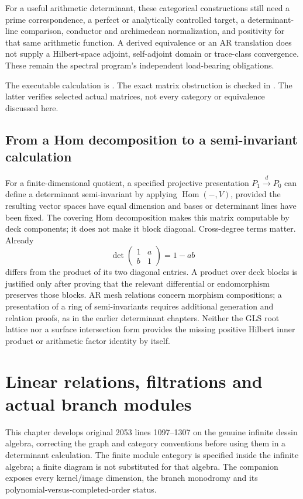 \documentclass[11pt,oneside,openany]{book}
\theoremstyle{definition}\newtheorem{definition}[theorem]{Definition}
\theoremstyle{remark}\newtheorem{remark}[theorem]{Remark}
\begin{document}
For a useful arithmetic determinant, these categorical constructions still
need a prime correspondence, a perfect or analytically controlled target,
a determinant-line comparison, conductor and archimedean normalization,
and positivity for that same arithmetic function. A derived equivalence
or an AR translation does not supply a Hilbert-space adjoint, self-adjoint
domain or trace-class convergence. These remain the spectral program's
independent load-bearing obligations.

The executable calculation is .
The exact matrix obstruction is checked in .
The latter verifies selected actual matrices, not every category or
equivalence discussed here.

\section{From a Hom decomposition to a semi-invariant calculation}
For a finite-dimensional quotient, a specified projective presentation
$P_1\xrightarrow{d}P_0$ can define a determinant semi-invariant by applying
$\operatorname{Hom}(-,V)$, provided the resulting vector spaces have equal
dimension and bases or determinant lines have been fixed. The covering Hom
decomposition makes this matrix computable by deck components; it does not
make it block diagonal. Cross-degree terms matter. Already
\[
 \det\begin{pmatrix}1&a\\b&1\end{pmatrix}=1-ab
\]
differs from the product of its two diagonal entries. A product over deck
blocks is justified only after proving that the relevant differential or
endomorphism preserves those blocks. AR mesh relations concern morphism
compositions; a presentation of a ring of semi-invariants requires additional
generation and relation proofs, as in the earlier determinant chapters.
Neither the GLS root lattice nor a surface intersection form provides the
missing positive Hilbert inner product or arithmetic factor identity by
itself.

\chapter{Linear relations, filtrations and actual branch modules}
\label{rel:chapter}
This chapter develops original 2053 lines 1097--1307 on the genuine infinite
dessin algebra, correcting the graph and category conventions before
using them in a determinant calculation. The finite module category is
specified inside the infinite algebra; a finite diagram is not substituted
for that algebra. The companion exposes every kernel/image dimension,
the branch monodromy and its polynomial-versus-completed-order status.
\end{document}
